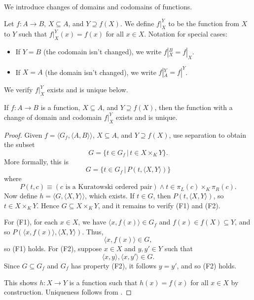 We introduce changes of domains and codomains of functions. 

\begin{definition}
	Let $f:A\rightarrow B$, $X\subseteq A$, and $Y\supseteq f(X)$.
	We define $f|_{X}^{Y}$ to be the function from $X$ to $Y$ such that $f|_{X}^{Y}(x) = f(x)$ for all $x\in X$. 
	Notation for special cases:
	\begin{itemize}[itemsep=-0.4ex]
		\item If $Y = B$ (the codomain isn't changed), we write $f|_{X}^{B} = f|_{X}$.
		\item If $X = A$ (the domain isn't changed), we write $f|_{A}^{Y} = f|^{Y}$. 
	\end{itemize}
	\noindent We verify $f|_{X}^{Y}$ exists and is unique below. 
\end{definition}

\begin{prop}
	If $f:A\rightarrow B$ is a function, $X\subseteq A$, and $Y\supseteq f(X)$, then the function with a change of domain and codomain $f|_{X}^{Y}$ exists and is unique. 
\end{prop}
\begin{proof}
	Given $f = \langle G_{f}, \langle A, B\rangle\rangle$, $X\subseteq A$, and $Y\supseteq f(X)$, use separation to obtain the subset
	\[ G = \{ t\in G_{f} \,|\, t\in X\times_{K} Y \}. \]
	More formally, this is
	\[ G = \{ t\in G_{f} \,|\, P(t, \langle X, Y\rangle) \} \]
	where 
	\[ P(t, c)\equiv (c\text{ is a Kuratowski ordered pair})\land t\in \pi_{L}(c)\times_{K}\pi_{R}(c). \] 
	Now define $h = \langle G, \langle X, Y\rangle\rangle$, which exists. 
	If $t\in G$, then $P(t, \langle X, Y\rangle)$, so $t\in X\times_{K} Y$.
	Hence $G\subseteq X\times_{K} Y$, and it remains to verify (F1) and (F2). 
	
	For (F1), for each $x\in X$, we have $\langle x, f(x)\rangle\in G_{f}$ and $f(x)\in f(X)\subseteq Y$, and so $P(\langle x, f(x)\rangle, \langle X, Y\rangle)$. 
	Thus, 
	\[ \langle x, f(x)\rangle\in G, \] 
	so (F1) holds. 
	For (F2), suppose $x\in X$ and $y, y'\in Y$ such that 
	\[ \langle x, y\rangle, \langle x, y'\rangle \in G. \]
	Since $G\subseteq G_{f}$ and $G_{f}$ has property (F2), it follows $y = y'$, and so (F2) holds. 
	
	This shows $h:X\rightarrow Y$ is a function such that $h(x) = f(x)$ for all $x\in X$ by construction. 
	Uniqueness follows from .
\end{proof}

